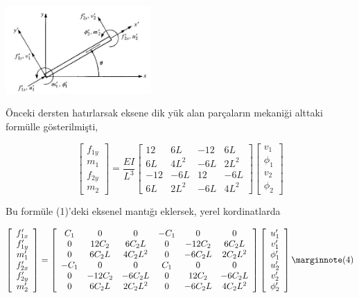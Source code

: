 \documentclass[12pt,fleqn]{article}\usepackage{../../common}
\begin{document}
\includegraphics[width=15em]{phy_020_strs_06_02.jpg}

Önceki dersten hatırlarsak eksene dik yük alan parçaların mekaniği alttaki
formülle gösterilmişti,

$$
\left[\begin{array}{c}
f_{1y} \\ m_1 \\ f_{2y} \\ m_2
\end{array}\right] =
\frac{EI}{L^3}
\left[\begin{array}{cccc}
12 & 6L & -12 & 6L \\
6L & 4L^2 & -6L & 2L^2 \\
-12 & -6L & 12 & -6L \\
6L & 2L^2 & -6L & 4L^2
\end{array}\right]
\left[\begin{array}{ccc}
v_1 \\ \phi_1 \\ v_2 \\ \phi_2
\end{array}\right]
$$

Bu formüle (1)'deki eksenel mantığı eklersek, yerel kordinatlarda

$$
\left[\begin{array}{c}
f'_{1x} \\ f'_{1y} \\ m'_1 \\ f'_{2x} \\ f'_{2y} \\ m'_2
\end{array}\right] =
\left[\begin{array}{cccccc}
C_1 & 0 & 0 & -C_1 & 0 & 0 \\
0 & 12C_2 & 6 C_2 L & 0 & -12 C_2 & 6 C_2 L \\
0 & 6C_2 L & 4 C_2 L^2 & 0 & -6 C_2 L & 2 C_2 L^2 \\
-C_1 & 0 & 0 & C_1 & 0 & 0 \\
0 & -12C_2 & -6 C_2 L & 0 & 12 C_2 & -6 C_2 L \\
0 & 6 C_2 L & 2 C_2 L^2 & 0 & -6C_2 L & 4C_2 L^2
\end{array}\right]
\left[\begin{array}{c}
u'_1 \\ v'_1 \\ \phi'_1 \\ u'_2 \\ v'_2 \\ \phi'_2
\end{array}\right]
\mlabel{4}
$$
\end{document}
